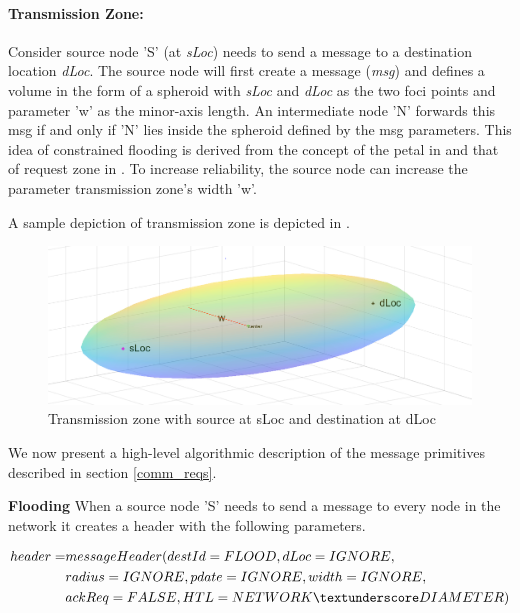 \paragraph{Transmission Zone:} Consider source node 'S' (at \emph{sLoc}) needs to send a message to a destination location \emph{dLoc}. The source node will first create a message (\emph{msg}) and defines a volume in the form of a spheroid with \emph{sLoc} and \emph{dLoc} as the two foci points and parameter 'w' as the minor-axis length. An intermediate node 'N' forwards this msg if and only if 'N' lies inside the spheroid defined by the msg parameters. This idea of constrained flooding is derived from the concept of the petal in \cite{6133499} and that of request zone in \cite{Ko:1998:LRM:288235.288252}. To increase reliability, the source node can increase the parameter transmission zone's width 'w'.

A sample depiction of transmission zone is depicted in .

\begin{figure}[hbtp]
\centering
\includegraphics[width=1\textwidth]{Chapter-3/figs/Spheroid}
\caption{Transmission zone with source at sLoc and destination at dLoc}
\label{fig:spheroid}
\end{figure}

We now present a high-level algorithmic description of the message primitives described in section \ref{comm_reqs}.

\textbf{Flooding}
When a source node 'S' needs to send a message to every node in the network it creates a header with the following parameters.

\begin{eqnarray*}
header = & messageHeader(destId = FLOOD, dLoc = IGNORE, \\
    & radius = IGNORE, pdate = IGNORE, width = IGNORE, \\
    & ackReq = FALSE, HTL = NETWORK\textunderscore DIAMETER)
\end{eqnarray*} 

